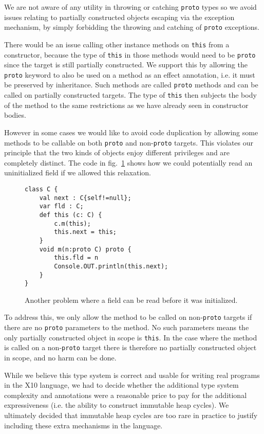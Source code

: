 We are not aware of any utility in throwing or catching \texttt{proto} types so
we avoid issues relating to partially constructed objects escaping via the
exception mechanism, by simply forbidding the throwing and catching of
\texttt{proto} exceptions.

There would be an issue calling other instance methods on \texttt{this} from a
constructor, because the type of \texttt{this} in those methods would need to
be \texttt{proto} since the target is still partially constructed.  We support
this by allowing the \texttt{proto} keyword to also be used on a method as an
effect annotation, i.e. it must be preserved by inheritance.  Such methods are
called \texttt{proto} methods and can be called on partially constructed
targets.  The type of \texttt{this} then subjects the body of the method to the
same restrictions as we have already seen in constructor bodies.

However in some cases we would like to avoid code duplication by allowing some
methods to be callable on both \texttt{proto} and non-\texttt{proto} targets.
This violates our principle that the two kinds of objects enjoy different
privileges and are completely distinct.  The code in fig.~\ref{Figure:Problem2}
shows how we could potentially read an uninitialized field if we allowed this
relaxation.

\begin{figure}
\begin{lstlisting}
class C {
    val next : C{self!=null};
    var fld : C;
    def this (c: C) {
        c.m(this);
        this.next = this;
    }
    void m(n:proto C) proto {
        this.fld = n
        Console.OUT.println(this.next);
    }
}
\end{lstlisting}
\caption{Another problem where a field can be read before it was initialized.}
\label{Figure:Problem2}
\end{figure}

To address this, we only allow the method to be called on non-\texttt{proto}
targets if there are no \texttt{proto} parameters to the method.  No such
parameters means the only partially constructed object in scope is
\texttt{this}.  In the case where the method is called on a non-\texttt{proto}
target there is therefore no partially constructed object in scope, and no harm
can be done.

While we believe this type system is correct and usable for writing real
programs in the X10 language, we had to decide whether the additional type
system complexity and annotations were a reasonable price to pay for the
additional expressiveness (i.e. the ability to construct immutable heap
cycles).  We ultimately decided that immutable heap cycles are too rare in
practice to justify including these extra mechanisms in the language.
